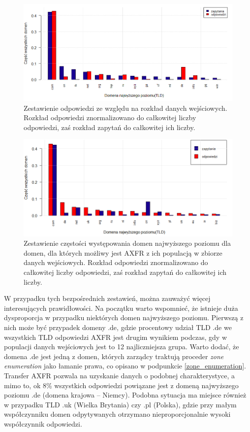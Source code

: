 \begin{figure}[h]
	\centering
	\includegraphics[width=1.0\textwidth]{image/req_to_resp_no_title}
	\caption{Zestawienie odpowiedzi ze względu na rozkład danych wejściowych. Rozkład odpowiedzi znormalizowano do całkowitej liczby
	odpowiedzi, zaś rozkład zapytań do całkowitej ich liczby.}
	\label{req_to_resp}
\end{figure}

\begin{figure}[h]
	\centering
	\includegraphics[width=1.0\textwidth]{image/resp_to_req_no_title}
	\caption{Zestawienie częstości występowania domen najwyższego poziomu dla domen, dla których możliwy jest AXFR z ich populacją
	w zbiorze danych wejściowych. Rozkład odpowiedzi znormalizowano do całkowitej liczby
	odpowiedzi, zaś rozkład zapytań do całkowitej ich liczby.}
	\label{resp_to_req}
\end{figure}

W przypadku tych bezpośrednich zestawień, można zauważyć więcej interesujących prawidłowości. Na początku warto wspomnieć, że
istnieje duża dysproporcja w przypadku niektórych domen najwyższego poziomu. Pierwszą z nich może być przypadek domeny .de,
gdzie procentowy udział TLD .de we wszystkich TLD odpowiedzi AXFR jest drugim wynikiem podczas, gdy w populacji danych wejściowych
jest to 12 najliczniejsza grupa. Warto dodać, że domena .de jest jedną z domen, których zarządcy traktują proceder
\textit{zone enumeration} jako łamanie prawa, co opisano w podpunkcie \ref{zone_enumeration}. Transfer AXFR pozwala na uzyskanie
danych o podobnej charakterystyce, a mimo to, ok 8\% wszystkich odpowiedzi powiązane jest z domeną najwyższego poziomu .de
(domena krajowa -- Niemcy). Podobna sytuacja ma miejsce również w przypadku TLD .uk (Wielka Brytania) czy .pl (Polska),
gdzie przy małym współczynniku domen odpytywanych otrzymano nieproporcjonalnie wysoki współczynnik odpowiedzi.

